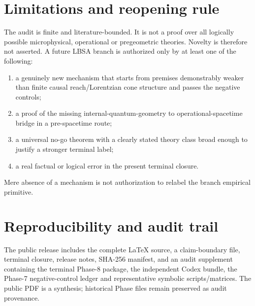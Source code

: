 \documentclass[11pt,a4paper]{article}
\begin{document}
\section{Limitations and reopening rule}
The audit is finite and literature-bounded.  It is not a proof over all logically possible microphysical, operational or pregeometric theories.  Novelty is therefore not asserted.  A future LBSA branch is authorized only by at least one of the following:
\begin{enumerate}
\item a genuinely new mechanism that starts from premises demonstrably weaker than finite causal reach/Lorentzian cone structure and passes the negative controls;
\item a proof of the missing internal-quantum-geometry to operational-spacetime bridge in a pre-spacetime route;
\item a universal no-go theorem with a clearly stated theory class broad enough to justify a stronger terminal label;
\item a real factual or logical error in the present terminal closure.
\end{enumerate}
Mere absence of a mechanism is not authorization to relabel the branch empirical primitive.

\section{Reproducibility and audit trail}
The public release includes the complete LaTeX source, a claim-boundary file, terminal closure, release notes, SHA-256 manifest, and an audit supplement containing the terminal Phase-8 package, the independent Codex bundle, the Phase-7 negative-control ledger and representative symbolic scripts/matrices.  The public PDF is a synthesis; historical Phase files remain preserved as audit provenance.

\appendix
\end{document}
